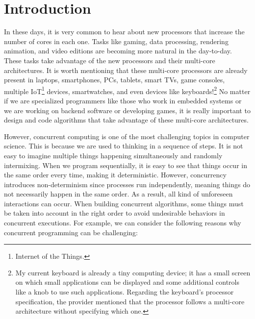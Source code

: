 \chapter{\label{chapter:1_Introduction}Introduction}

In these days, it is very common to hear about new processors that increase the number of cores in each one. Tasks like gaming, data processing, rendering animation, and video editions are becoming more natural in the day-to-day. These tasks take advantage of the new processors and their multi-core architectures. It is worth mentioning that these multi-core processors are already present in laptops, smartphones, PCs, tablets, smart TVs, game consoles, multiple IoT\footnote{Internet of the Things.} devices, smartwatches, and even devices like keyboards!\footnote{My current keyboard is already a tiny computing device; it has a small screen on which small applications can be displayed and some additional controls like a knob to use such applications. Regarding the keyboard's processor specification, the provider mentioned that the processor follows a multi-core architecture without specifying which one.} No matter if we are specialized programmers like those who work in embedded systems or we are working on backend software or developing games, it is really important to design and code algorithms that take advantage of these multi-core architectures.

However, concurrent computing is one of the most challenging topics in computer science. This is because we are used to thinking in a sequence of steps. It is not easy to imagine multiple things happening simultaneously and randomly intermixing. When we program sequentially, it is easy to see that things occur in the same order every time, making it deterministic. However, concurrency introduces non-determinism since processes run independently, meaning things do not necessarily happen in the same order. As a result, all kind of unforeseen interactions can occur. When building concurrent algorithms, some things must be taken into account in the right order to avoid undesirable behaviors in concurrent executions. For example, we can consider the following reasons why concurrent programming can be challenging:

